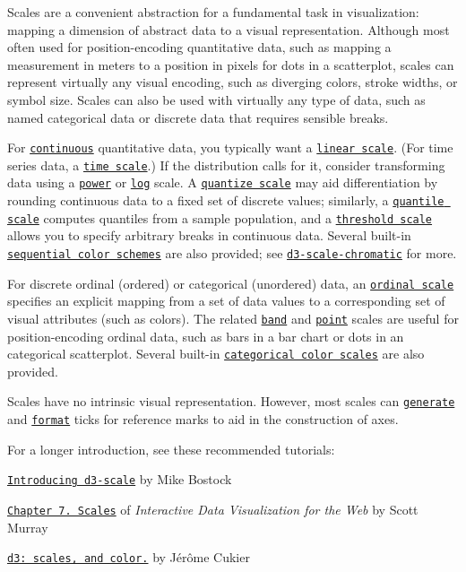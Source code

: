Scales are a convenient abstraction for a fundamental task in visualization\+: mapping a dimension of abstract data to a visual representation. Although most often used for position-\/encoding quantitative data, such as mapping a measurement in meters to a position in pixels for dots in a scatterplot, scales can represent virtually any visual encoding, such as diverging colors, stroke widths, or symbol size. Scales can also be used with virtually any type of data, such as named categorical data or discrete data that requires sensible breaks.

For \href{#continuous-scales}{\tt continuous} quantitative data, you typically want a \href{#linear-scales}{\tt linear scale}. (For time series data, a \href{#time-scales}{\tt time scale}.) If the distribution calls for it, consider transforming data using a \href{#power-scales}{\tt power} or \href{#log-scales}{\tt log} scale. A \href{#quantize-scales}{\tt quantize scale} may aid differentiation by rounding continuous data to a fixed set of discrete values; similarly, a \href{#quantile-scales}{\tt quantile scale} computes quantiles from a sample population, and a \href{#threshold-scales}{\tt threshold scale} allows you to specify arbitrary breaks in continuous data. Several built-\/in \href{#sequential-scales}{\tt sequential color schemes} are also provided; see \href{https://github.com/d3/d3-scale-chromatic}{\tt d3-\/scale-\/chromatic} for more.

For discrete ordinal (ordered) or categorical (unordered) data, an \href{#ordinal-scales}{\tt ordinal scale} specifies an explicit mapping from a set of data values to a corresponding set of visual attributes (such as colors). The related \href{#band-scales}{\tt band} and \href{#point-scales}{\tt point} scales are useful for position-\/encoding ordinal data, such as bars in a bar chart or dots in an categorical scatterplot. Several built-\/in \href{#category-scales}{\tt categorical color scales} are also provided.

Scales have no intrinsic visual representation. However, most scales can \href{#continuous_ticks}{\tt generate} and \href{#continuous_tickFormat}{\tt format} ticks for reference marks to aid in the construction of axes.

For a longer introduction, see these recommended tutorials\+:


\begin{DoxyItemize}
\item \href{https://medium.com/@mbostock/introducing-d3-scale-61980c51545f}{\tt Introducing d3-\/scale} by Mike Bostock
\item \href{http://chimera.labs.oreilly.com/books/1230000000345/ch07.html}{\tt Chapter 7. Scales} of {\itshape Interactive Data Visualization for the Web} by Scott Murray
\item \href{http://www.jeromecukier.net/blog/2011/08/11/d3-scales-and-color/}{\tt d3\+: scales, and color.} by Jérôme Cukier
\end{DoxyItemize}

